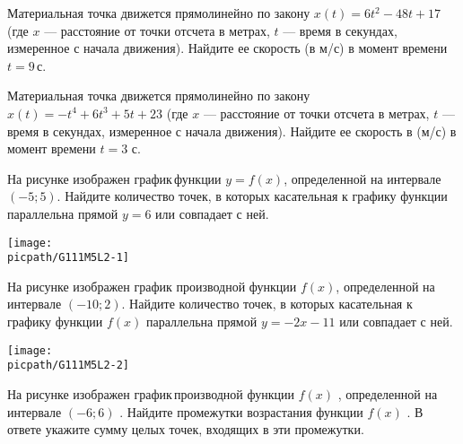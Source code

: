 \begin{class}[number=2]
	\begin{listofex}
		\item Материальная точка движется прямолинейно по закону \(x(t) = 6t^2 - 48t + 17\) (где \(x\)  — расстояние от точки отсчета в метрах, \(t\)  — время в секундах, измеренное с начала движения). Найдите ее скорость (в м/с) в момент времени \(t  =  9\) с.
		\item Материальная точка движется прямолинейно по закону \(x(t) = -t^4 + 6t^3 + 5t + 23\) (где \(x\)  — расстояние от точки отсчета в метрах, \(t\)  — время в секундах, измеренное с начала движения). Найдите ее скорость в (м/с) в момент времени \(t = 3\) с.
		\item
		\begin{minipage}[t]{\bodywidth}
			На рисунке изображен график функции \( y = f(x)\), определенной на интервале \((-5; 5)\). Найдите количество точек, в которых касательная к графику функции параллельна прямой \(y  =  6\) или совпадает с ней.
		\end{minipage}
		\hspace{0.02\linewidth}
		\begin{minipage}[t]{\picwidth}
			\texttt{[image: \\picpath/G111M5L2-1]}
		\end{minipage}
		\item
		\begin{minipage}[t]{\bodywidth}
			На рисунке изображен график производной функции \(f(x)\), определенной на интервале \((-10; 2)\). Найдите количество точек, в которых касательная к графику функции \(f(x)\) параллельна прямой \(y = -2x - 11\) или совпадает с ней.
		\end{minipage}
		\hspace{0.02\linewidth}
		\begin{minipage}[t]{\picwidth}
			\texttt{[image: \\picpath/G111M5L2-2]}
		\end{minipage}
		\item
		\begin{minipage}[t]{\bodywidth}
			На рисунке изображен график производной функции \(f(x)\) , определенной на интервале \( (-6;6) \) . Найдите промежутки возрастания функции \(f(x)\) . В ответе укажите сумму целых точек, входящих в эти промежутки.
		\end{minipage}
		\hspace{0.02\linewidth}
		\begin{minipage}[t]{\picwidth}

\end{minipage}
\end{listofex}
\end{class}
